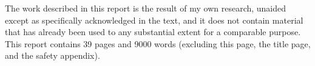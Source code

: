 
\begin{declaration}

    The work described in this report is the result of my own research, unaided except as
    specifically acknowledged in the text, and it does not contain material that has already been
    used to any substantial extent for a comparable purpose. This report contains 39 pages
    and 9000 words (excluding this page, the title page, and the safety appendix).


\end{declaration}

